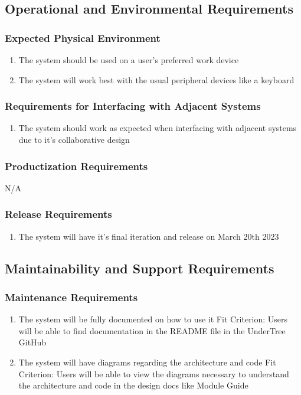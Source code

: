 \documentclass[12pt, titlepage]{article}
\begin{document}
	\subsection{Operational and Environmental Requirements}
	\subsubsection{Expected Physical Environment}
	\begin{enumerate}[resume*]
		\item The system should be used on a user's preferred work device
		\item The system will work best with the usual peripheral devices like a keyboard
	\end{enumerate}
	\subsubsection{Requirements for Interfacing with Adjacent Systems}
	\begin{enumerate}[resume*]
		\item The system should work as expected when interfacing with adjacent systems due to it's collaborative design 
	\end{enumerate}
	\subsubsection{Productization Requirements}
	N/A
	\subsubsection{Release Requirements}
	\begin{enumerate}[resume*]
		\item The system will have it's final iteration and release on March 20th 2023
	\end{enumerate}
	\subsection{Maintainability and Support Requirements}
	\subsubsection{Maintenance Requirements}
	\begin{enumerate}[resume*]
		\item The system will be fully documented on how to use it
		{\color{red}Fit Criterion: Users will be able to find documentation in the README file in the UnderTree GitHub}
		\item The system will have diagrams regarding the architecture and code 
		{\color{red}Fit Criterion: Users will be able to view the diagrams necessary to understand the architecture and code in the design docs like Module Guide}
	\end{enumerate}
\end{document}
